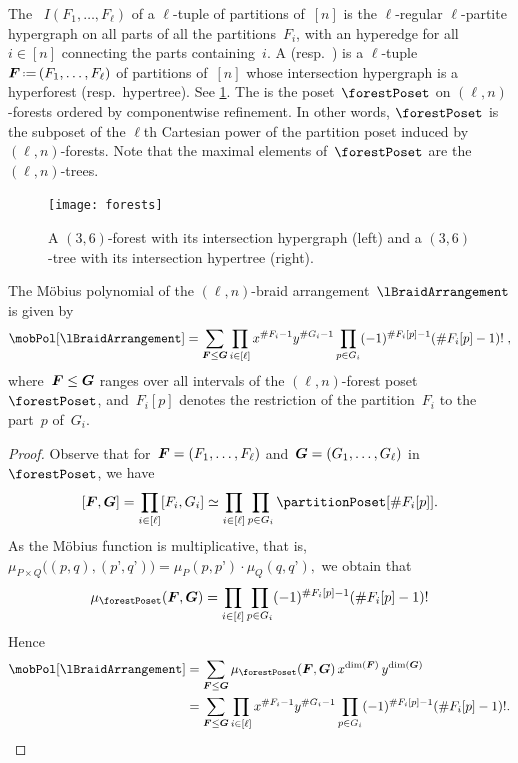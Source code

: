 \begin{definition}
The ~$I(F_1, \dots, F_\ell)$ of a $\ell$-tuple of partitions of~$[n]$ is the $\ell$-regular $\ell$-partite hypergraph on all parts of all the partitions~$F_i$, with an hyperedge for all~$i \in [n]$ connecting the parts containing~$i$.
A  (resp.~) is a $\ell$-tuple~$\b{F} \eqdef (F_1, \dots, F_\ell)$ of partitions of~$[n]$ whose intersection hypergraph is a hyperforest (resp.~hypertree).
See \cref{fig:forests}.
The  is the poset~$\forestPoset$ on $(\ell,n)$-forests ordered by componentwise refinement.
In other words, $\forestPoset$ is the subposet of the $\ell$th Cartesian power of the partition poset induced by $(\ell,n)$-forests.
Note that the maximal elements of~$\forestPoset$ are the $(\ell, n)$-trees.
%
\begin{figure}
	\centerline{\texttt{[image: forests]}}
	\caption{A $(3,6)$-forest with its intersection hypergraph (left) and a $(3,6)$-tree with its intersection hypertree (right).}
	\label{fig:forests}
\end{figure}
\end{definition}

\begin{theorem}
\label{thm:MobiusPolynomial}
The M\"obius polynomial of the $(\ell,n)$-braid arrangement~$\lBraidArrangement$ is given by
\[
\mobPol[\lBraidArrangement] = \sum_{\b{F} \le \b{G}} \prod_{i \in [\ell]} x^{\#F_i-1} y^{\#G_i-1} \prod_{p \in G_i} (-1)^{\#F_i[p]-1} (\# F_i[p]-1)! \; ,
\]
where~$\boldsymbol{F} \le \boldsymbol{G}$ ranges over all intervals of the $(\ell,n)$-forest poset~$\forestPoset$, and~$F_i[p]$ denotes the restriction of the partition~$F_i$ to the part~$p$ of~$G_i$.
\end{theorem}

\begin{proof}
Observe that for~$\boldsymbol{F} = (F_1, \dots, F_\ell)$ and~$\boldsymbol{G} = (G_1, \dots, G_\ell)$ in~$\forestPoset$, we have
\[
[\b{F}, \b{G}] = \prod_{i \in [\ell]} [F_i, G_i] \simeq \prod_{i \in [\ell]} \prod_{p \in G_i} \partitionPoset[{\#F_i[p]}].
\]
As the M\"obius function is multiplicative, that is,
\(
\mu_{P \times Q} \big( (p,q), (p’,q’) \big) = \mu_P(p,p’) \cdot \mu_Q(q,q’),
\)
we obtain that
\[
\mu_{\forestPoset}(\b{F}, \b{G}) = \prod_{i \in [\ell]} \prod_{p \in G_i} (-1)^{\#F_i[p]-1} (\# F_i[p]-1)!
\]
Hence
\begin{align*}
\mobPol[\lBraidArrangement] 
& = \sum_{\b{F} \le \b{G}} \mu_{\forestPoset}(\b{F}, \b{G}) \, x^{\dim(\b{F})} \, y^{\dim(\b{G})} \\
& = \sum_{\b{F} \le \b{G}} \prod_{i \in [\ell]} x^{\#F_i-1} y^{\#G_i-1} \prod_{p \in G_i} (-1)^{\#F_i[p]-1} (\# F_i[p]-1)!.
\qedhere
\end{align*}
\end{proof}

